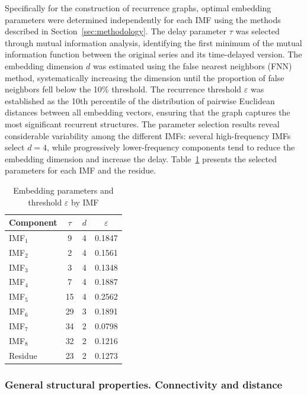 \documentclass[11pt,a4paper]{article}
\begin{document}
\FloatBarrier

Specifically for the construction of recurrence graphs, optimal embedding parameters were determined independently for each IMF using the methods described in Section~\ref{sec:methodology}. The delay parameter $\tau$ was selected through mutual information analysis, identifying the first minimum of the mutual information function between the original series and its time-delayed version. The embedding dimension $d$ was estimated using the false nearest neighbors (FNN) method, systematically increasing the dimension until the proportion of false neighbors fell below the 10\% threshold. The recurrence threshold $\varepsilon$ was established as the 10th percentile of the distribution of pairwise Euclidean distances between all embedding vectors, ensuring that the graph captures the most significant recurrent structures. The parameter selection results reveal considerable variability among the different IMFs: several high-frequency IMFs select $d=4$, while progressively lower-frequency components tend to reduce the embedding dimension and increase the delay. Table~\ref{tab:parametros_recurrencia} presents the selected parameters for each IMF and the residue.

\begin{table}[h]
\centering
\caption{Embedding parameters and threshold $\varepsilon$ by IMF}
\label{tab:parametros_recurrencia}
\small
\begin{tabular}{lccc}
\toprule
\textbf{Component} & \textbf{$\tau$} & \textbf{$d$} & \textbf{$\varepsilon$} \\
\midrule
IMF$_1$ & 9 & 4 & 0.1847 \\
IMF$_2$ & 2 & 4 & 0.1561 \\
IMF$_3$ & 3 & 4 & 0.1348 \\
IMF$_4$ & 7 & 4 & 0.1887 \\
IMF$_5$ & 15 & 4 & 0.2562 \\
IMF$_6$ & 29 & 3 & 0.1891 \\
IMF$_7$ & 34 & 2 & 0.0798 \\
IMF$_8$ & 32 & 2 & 0.1216 \\
Residue & 23 & 2 & 0.1273 \\
\bottomrule
\end{tabular}
\end{table}

\subsubsection{General structural properties. Connectivity and distance}
\end{document}
